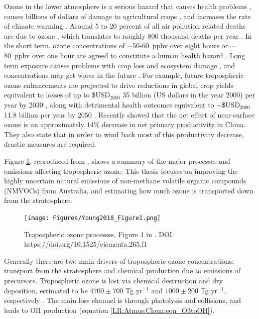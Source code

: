     Ozone in the lower atmosphere is a serious hazard that causes health problems \parencite{Hsieh2013}, causes billions of dollars of damage to agricultural crops \parencite{Avnery2011, Yue2017}, and increases the rate of climate warming \parencite{IPCC_2013_chap8}.
    Around 5 to 20 percent of all air pollution related deaths are due to ozone \parencite{Monks2015}, which translates to roughly 800 thousand deaths per year \parencite{Lelieveld2013}.
    In the short term, ozone concentrations of $\sim$50-60~ppbv over eight hours or $\sim$80~ppbv over one hour are agreed to constitute a human health hazard \parencite{Ayers2006, Lelieveld2009}. 
    Long term exposure causes problems with crop loss and ecosystem damage \parencite{Emberson2003}, and concentrations may get worse in the future \parencite{Lelieveld2009, Stevenson2013}.
    For example, future tropospheric ozone enhancements are projected to drive 
    reductions in global crop yields equivalent to losses of up to 
    \$USD$_{2000}$ 35 billion (US dollars in the year 2000) per year by 2030 
    \parencite{Avnery2011}, along with detrimental health outcomes equivalent 
    to $\sim$\$USD$_{2000}$11.8 billion per year by 2050 \parencite{Selin2009}.
    Recently \textcite{Yue2017} showed that the net effect of near-surface ozone is an approximately $14\%$ decrease in net primary productivity in China.
    They also state that in order to wind back most of this productivity decrease, drastic measures are required. %
    
    Figure \ref{LR:O3:fig_YoungOzoneSummary}, reproduced from \textcite{Young2018}, shows a summary of the major processes and emissions affecting tropospheric ozone.
    This thesis focuses on improving the highly uncertain natural emissions of 
    non-methane volatile organic compounds (NMVOCs) from Australia, and 
    estimating how much ozone is transported down from the stratosphere.
    
    \begin{figure}
      \texttt{[image: Figures/Young2018\_Figure1.png]}
      \caption{%
        Tropospheric ozone processes, Figure 1 in \textcite{Young2018}.
        DOI: https://doi.org/10.1525/elementa.265.f1
      }
      \label{LR:O3:fig_YoungOzoneSummary}
    \end{figure}
  
    Generally there are two main drivers of tropospheric ozone concentrations: 
    transport from the stratosphere and chemical production due to emissions of 
    precursors. 
    Tropospheric ozone is lost via chemical destruction and dry deposition, 
    estimated to be $4700\pm700$ Tg yr$^{-1}$ and $1000\pm200$ Tg yr$^{-1}$, 
    respectively \parencite{Stevenson2006, Young2018}.
    The main loss channel is through photolysis and collisions, and leads to OH 
    production (equation \ref{LR:Atmos:Chem:eqn_O3toOH}).
  
